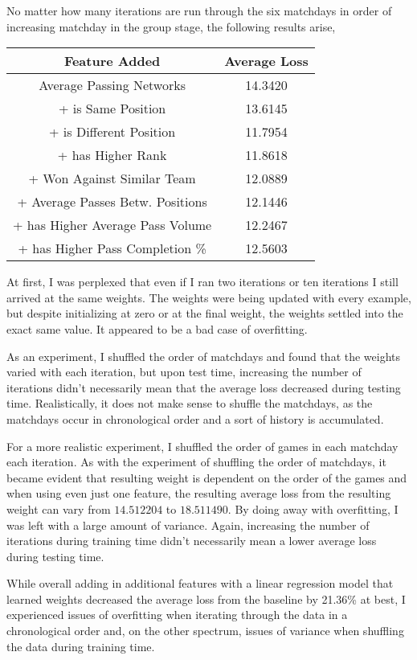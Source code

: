 \documentclass[11pt,letterpaper]{article}
\begin{document}
No matter how many iterations are run through the six matchdays in order of increasing matchday in the group stage, the following results arise,

\begin{tabular} {|c|c|}
\hline Feature Added & Average Loss \\ \hline
Average Passing Networks & 14.3420 \\ \hline
+ is Same Position & 13.6145 \\ \hline
+ is Different Position & 11.7954 \\ \hline
+ has Higher Rank & 11.8618 \\ \hline
+ Won Against Similar Team & 12.0889 \\ \hline
+ Average Passes Betw. Positions & 12.1446 \\ \hline
+ has Higher Average Pass Volume & 12.2467 \\ \hline
+ has Higher Pass Completion \% & 12.5603 \\ \hline
\end{tabular} 

At first, I was perplexed that even if I ran two iterations or ten iterations I still arrived at the same weights. The weights were being updated with every example, but despite initializing at zero or at the final weight, the weights settled into the exact same value. It appeared to be a bad case of overfitting.

As an experiment, I shuffled the order of matchdays and found that the weights varied with each iteration, but upon test time, increasing the number of iterations didn't necessarily mean that the average loss decreased during testing time. Realistically, it does not make sense to shuffle the matchdays, as the matchdays occur in chronological order and a sort of history is accumulated.

For a more realistic experiment, I shuffled the order of games in each matchday each iteration. As with the experiment of shuffling the order of matchdays, it became evident that resulting weight is dependent on the order of the games and when using even just one feature, the resulting average loss from the resulting weight can vary from $14.512204$ to $18.511490$. By doing away with overfitting, I was left with a large amount of variance. Again, increasing the number of iterations during training time didn't necessarily mean a lower average loss during testing time.

While overall adding in additional features with a linear regression model that learned weights decreased the average loss from the baseline by 21.36\% at best, I experienced issues of overfitting when iterating through the data in a chronological order and, on the other spectrum, issues of variance when shuffling the data during training time.
\end{document}
